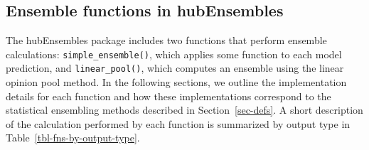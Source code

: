 \documentclass[
  letterpaper,
  DIV=11,
  numbers=noendperiod]{scrartcl}
\begin{document}
\subsection{Ensemble functions in hubEnsembles}\label{sec-ens-fns}

The {hubEnsembles} package includes two functions that perform ensemble
calculations: \texttt{simple\_ensemble()}, which applies some function
to each model prediction, and \texttt{linear\_pool()}, which computes an
ensemble using the linear opinion pool method. In the following
sections, we outline the implementation details for each function and
how these implementations correspond to the statistical ensembling
methods described in Section~\ref{sec-defs}. A short description of the
calculation performed by each function is summarized by output type in
Table~\ref{tbl-fns-by-output-type}.
\end{document}
